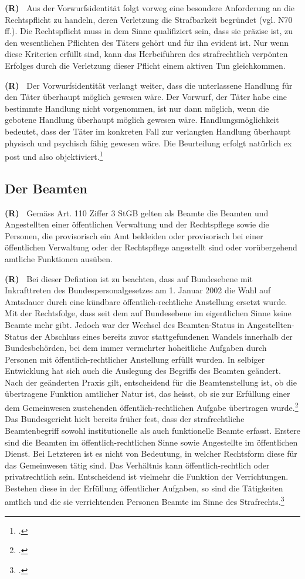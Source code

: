 \documentclass[paper=a4,fontsize=12pt, oneside, numbers=noenddot]{scrbook}
\newcounter{rz}
\newcommand{\Rz}{
	\addtocounter{rz}{1}\textbf{(R\arabic{rz})~}
}
\begin{document}
\Rz Aus der Vorwurfsidentität folgt vorweg eine besondere Anforderung an die Rechtspflicht zu handeln, deren Verletzung die Strafbarkeit begründet (vgl. N70 ff.). Die Rechtspflicht muss in dem Sinne qualifiziert sein, dass sie präzise ist, zu den wesentlichen Pflichten des Täters gehört und für ihn evident ist. Nur wenn diese Kriterien erfüllt sind, kann das Herbeiführen des strafrechtlich verpönten Erfolges durch die Verletzung dieser Pflicht einem aktiven Tun gleichkommen.

\Rz Der Vorwurfsidentität verlangt weiter, dass die unterlassene Handlung für den Täter überhaupt möglich gewesen wäre. Der Vorwurf, der Täter habe eine bestimmte Handlung nicht vorgenommen, ist nur dann möglich, wenn die gebotene Handlung überhaupt möglich gewesen wäre. Handlungsmöglichkeit bedeutet, dass der Täter im konkreten Fall zur verlangten Handlung überhaupt physisch und psychisch fähig gewesen wäre. Die Beurteilung erfolgt natürlich ex post und also objektiviert.\footcite[Art. 11, Rz 120]{2019:Niggli:BSKStGB}




\subsection{Der Beamten}\label{Recht:Beamte}
\Rz Gemäss Art. 110 Ziffer 3 StGB gelten als Beamte die Beamten und Angestellten einer öffentlichen Verwaltung und der Rechtspflege sowie die Personen, die provisorisch ein Amt bekleiden oder provisorisch bei einer öffentlichen Verwaltung oder der Rechtspflege angestellt sind oder vorübergehend amtliche Funktionen ausüben. 

\Rz Bei dieser Defintion ist zu beachten, dass auf Bundesebene mit Inkrafttreten des Bundespersonalgesetzes am 1. Januar 2002 die Wahl auf Amtsdauer durch eine kündbare öffentlich-rechtliche Anstellung ersetzt wurde. Mit der Rechtsfolge, dass seit dem auf Bundesebene im eigentlichen Sinne keine Beamte mehr gibt. Jedoch war der Wechsel des Beamten-Status in Angestellten-Status der Abschluss eines bereits zuvor stattgefundenen Wandels innerhalb der Bundesbehörden, bei dem immer vermehrter hoheitliche Aufgaben durch Personen mit öffentlich-rechtlicher Anstellung erfüllt wurden. In selbiger Entwicklung hat sich auch die Auslegung des Begriffs des Beamten geändert. Nach der geänderten Praxis gilt, entscheidend für die Beamtenstellung ist, ob die übertragene Funktion amtlicher Natur ist, das heisst, ob sie zur Erfüllung einer dem Gemeinwesen zustehenden öffentlich-rechtlichen Aufgabe übertragen wurde.\footcite[Erw. 1.3]{BGE141IV329} Das Bundesgericht hielt bereits früher fest, dass der strafrechtliche Beamtenbegriff sowohl institutionelle als auch funktionelle Beamte erfasst. Erstere sind die Beamten im öffentlich-rechtlichen Sinne sowie Angestellte im öffentlichen Dienst. Bei Letzteren ist es nicht von Bedeutung, in welcher Rechtsform diese für das Gemeinwesen tätig sind. Das Verhältnis kann öffentlich-rechtlich oder privatrechtlich sein. Entscheidend ist vielmehr die Funktion der Verrichtungen. Bestehen diese in der Erfüllung öffentlicher Aufgaben, so sind die Tätigkeiten amtlich und die sie verrichtenden Personen Beamte im Sinne des Strafrechts.\footcite{BGE135IV198}
\end{document}

